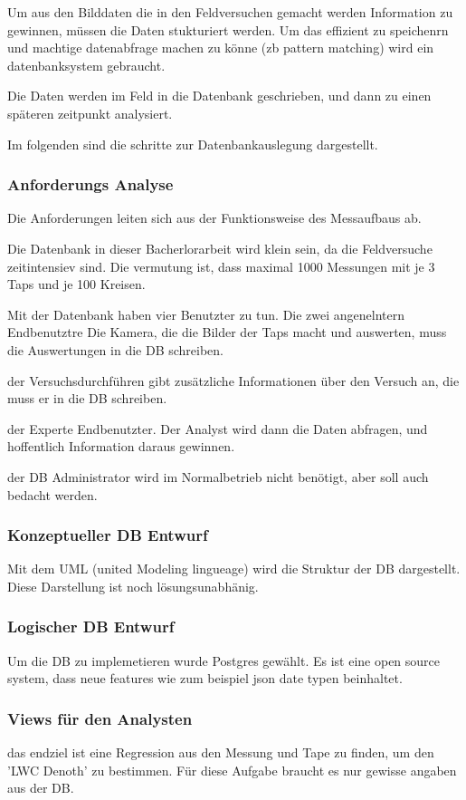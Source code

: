 Um aus den Bilddaten die in den Feldversuchen gemacht werden Information zu gewinnen, müssen die Daten stukturiert werden. Um das effizient zu speichenrn und machtige datenabfrage machen zu könne (zb pattern matching) wird ein datenbanksystem gebraucht.

Die Daten werden im Feld in die Datenbank geschrieben, und dann zu einen späteren zeitpunkt analysiert.

Im folgenden sind die schritte zur Datenbankauslegung dargestellt.

\subsubsection{Anforderungs Analyse}
Die Anforderungen leiten sich aus der Funktionsweise  des Messaufbaus ab.

Die Datenbank in dieser Bacherlorarbeit wird klein sein, da die Feldversuche zeitintensiev sind. Die vermutung ist, dass maximal 1000 Messungen mit je 3 Taps und je 100 Kreisen.

Mit der Datenbank haben vier Benutzter zu tun.
Die zwei angenelntern Endbenutztre
Die Kamera, die die Bilder der Taps macht und auswerten, muss die Auswertungen in die DB schreiben.

der Versuchsdurchführen gibt zusätzliche Informationen über den Versuch an, die muss er in die DB schreiben.

der Experte Endbenutzter.
Der Analyst wird dann die Daten abfragen, und hoffentlich Information daraus gewinnen.

der DB Administrator wird im Normalbetrieb nicht benötigt, aber soll auch bedacht werden.

\subsubsection{Konzeptueller DB Entwurf}
Mit dem UML (united Modeling lingueage) wird die Struktur der DB dargestellt. Diese Darstellung ist noch lösungsunabhänig.


\subsubsection{Logischer DB Entwurf}
Um die DB zu implemetieren wurde Postgres gewählt. Es ist eine open source system, dass neue features wie zum beispiel json date typen beinhaltet.

\subsubsection{Views für den Analysten}
das endziel ist eine Regression aus den Messung und Tape zu finden, um den 'LWC Denoth'  zu bestimmen. Für diese Aufgabe braucht es nur gewisse angaben aus der DB.

